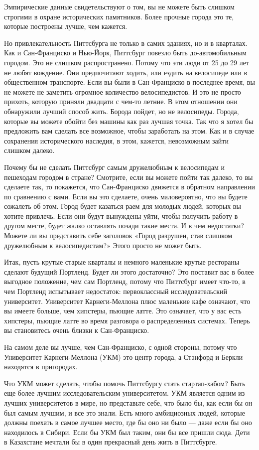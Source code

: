 \documentclass[ebook,12pt,oneside,openany]{memoir}
\begin{document}
Эмпирические данные свидетельствуют о том, вы не можете быть слишком
строгими в охране исторических памятников. Более прочные города это
те, которые построены лучше, чем кажется.

Но привлекательность Питтсбурга не только в самих зданиях, но и в
кварталах. Как и Сан-Франциско и Нью-Йорк, Питтсбург повезло быть
до-автомобильным городом. Это не слишком распространено. Потому что
эти люди от 25 до 29 лет не любят вождение. Они предпочитают ходить,
или ездить на велосипеде или в общественном транспорте. Если вы были в
Сан-Франциско в последнее время, вы не можете не заметить огромное
количество велосипедистов. И это не просто прихоть, которую приняли
двадцати с чем-то летние. В этом отношении они обнаружили лучший
способ жить. Борода пойдет, но не велосипеды. Города, которые вы
можете обойти без машины как раз лучшая точка. Так что я хотел бы
предложить вам сделать все возможное, чтобы заработать на этом. Как и
в случае сохранения исторического наследия, в этом, кажется,
невозможным зайти слишком далеко.

Почему бы не сделать Питтсбург самым дружелюбным к велосипедам и
пешеходам городом в стране? Смотрите, если вы можете пойти так далеко,
то вы сделаете так, то покажется, что Сан-Франциско движется в
обратном направлении по сравнению с вами. Если вы это сделаете, очень
маловероятно, что вы будете сожалеть об этом. Город будет казаться
раем для молодых людей, которых вы хотите привлечь. Если они будут
вынуждены уйти, чтобы получить работу в другом месте, будет жалко
оставлять позади такие места. И в чем недостатки? Можете ли вы
представить себе заголовок «Город разрушен, став слишком дружелюбным к
велосипедистам?» Этого просто не может быть.

Итак, пусть крутые старые кварталы и немного маленькие крутые
рестораны сделают будущий Портленд. Будет ли этого достаточно? Это
поставит вас в более выгодное положение, чем сам Портленд, потому что
Питтсбург имеет что-то, в чем Портленд испытывает недостаток:
первоклассный исследовательский университет. Университет
Карнеги-Меллона плюс маленькие кафе означают, что вы имеете больше,
чем хипстеры, пьющие латте. Это означает, что у вас есть хипстеры,
пьющие латте во время разговора о распределенных системах. Теперь вы
становитесь очень близки к Сан-Франциско.

На самом деле вы лучше, чем Сан-Франциско, с одной стороны, потому что
Университет Карнеги-Меллона (УКМ) это центр города, а Стэнфорд и
Беркли находятся в пригородах.

Что УКМ может сделать, чтобы помочь Питтсбургу стать стартап-хабом?
Быть еще более лучшим исследовательским университетом. УКМ является
одним из лучших университетов в мире, но представьте себе, что было
бы, как если бы он был самым лучшим, и все это знали. Есть много
амбициозных людей, которые должны поехать в самое лучшее место, где бы
оно ни было — даже если бы оно находилось в Сибири. Если бы УКМ был
таким, они бы все пришли сюда. Дети в Казахстане мечтали бы в один
прекрасный день жить в Питтсбурге.
\end{document}
